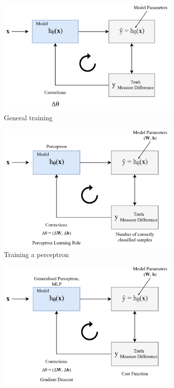 \documentclass[11pt]{article}
\begin{document}
\begin{figure}[htb]
	\centering
	\begin{subfigure}[b]{0.3\textwidth}
		\includegraphics[width=\textwidth]{model_training}
		\caption{General training}
		\label{fig:generalmodeltraining}
	\end{subfigure}
	\begin{subfigure}[b]{0.3\textwidth}
		\includegraphics[width=\textwidth]{model_training_perceptron}
		\caption{Training a perceptron}
		\label{fig:perceptrontraining}
	\end{subfigure}
	\begin{subfigure}[b]{0.3\textwidth}
		\includegraphics[width=\textwidth]{model_training_mlp}

\end{subfigure}
\end{figure}
\end{document}
